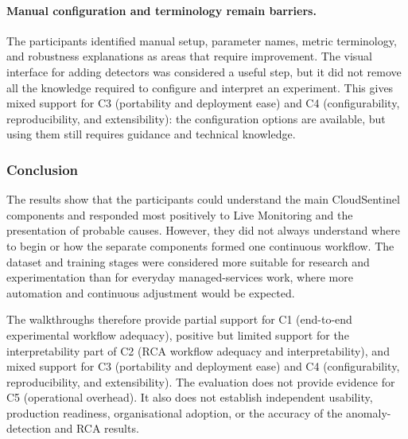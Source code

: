 \paragraph{Manual configuration and terminology remain barriers.}

The participants identified manual setup, parameter names, metric terminology, and robustness explanations as areas that require improvement. The visual interface for adding detectors was considered a useful step, but it did not remove all the knowledge required to configure and interpret an experiment. This gives mixed support for C3 (portability and deployment ease) and C4 (configurability, reproducibility, and extensibility): the configuration options are available, but using them still requires guidance and technical knowledge.

\subsubsection{Conclusion}

The results show that the participants could understand the main CloudSentinel components and responded most positively to Live Monitoring and the presentation of probable causes. However, they did not always understand where to begin or how the separate components formed one continuous workflow. The dataset and training stages were considered more suitable for research and experimentation than for everyday managed-services work, where more automation and continuous adjustment would be expected.

The walkthroughs therefore provide partial support for C1 (end-to-end experimental workflow adequacy), positive but limited support for the interpretability part of C2 (RCA workflow adequacy and interpretability), and mixed support for C3 (portability and deployment ease) and C4 (configurability, reproducibility, and extensibility). The evaluation does not provide evidence for C5 (operational overhead). It also does not establish independent usability, production readiness, organisational adoption, or the accuracy of the anomaly-detection and RCA results.



